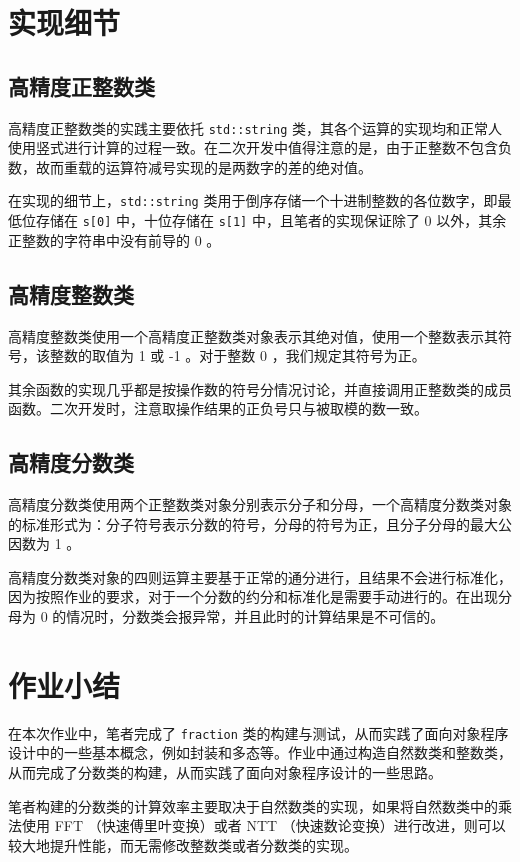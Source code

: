 \documentclass[cn,black,12pt,normal]{elegantnote}
\begin{document}
\section{实现细节}

\subsection{高精度正整数类}

高精度正整数类的实践主要依托 \lstinline{std::string} 类，其各个运算的实现均和正常人使用竖式进行计算的过程一致。在二次开发中值得注意的是，由于正整数不包含负数，故而重载的运算符减号实现的是两数字的差的绝对值。

在实现的细节上，\lstinline{std::string} 类用于倒序存储一个十进制整数的各位数字，即最低位存储在 \lstinline{s[0]} 中，十位存储在 \lstinline{s[1]} 中，且笔者的实现保证除了 0 以外，其余正整数的字符串中没有前导的 0 。

\subsection{高精度整数类}
高精度整数类使用一个高精度正整数类对象表示其绝对值，使用一个整数表示其符号，该整数的取值为 1 或 -1 。对于整数 0 ，我们规定其符号为正。

其余函数的实现几乎都是按操作数的符号分情况讨论，并直接调用正整数类的成员函数。二次开发时，注意取操作结果的正负号只与被取模的数一致。

\subsection{高精度分数类}
高精度分数类使用两个正整数类对象分别表示分子和分母，一个高精度分数类对象的标准形式为：分子符号表示分数的符号，分母的符号为正，且分子分母的最大公因数为 1 。

高精度分数类对象的四则运算主要基于正常的通分进行，且结果不会进行标准化，因为按照作业的要求，对于一个分数的约分和标准化是需要手动进行的。在出现分母为 0 的情况时，分数类会报异常，并且此时的计算结果是不可信的。

\section{作业小结}

在本次作业中，笔者完成了 \lstinline{fraction} 类的构建与测试，从而实践了面向对象程序设计中的一些基本概念，例如封装和多态等。作业中通过构造自然数类和整数类，从而完成了分数类的构建，从而实践了面向对象程序设计的一些思路。

笔者构建的分数类的计算效率主要取决于自然数类的实现，如果将自然数类中的乘法使用 FFT （快速傅里叶变换）或者 NTT （快速数论变换）进行改进，则可以较大地提升性能，而无需修改整数类或者分数类的实现。
\end{document}
